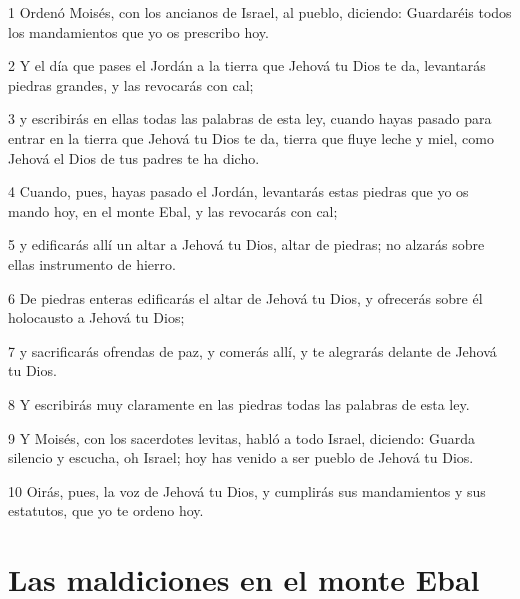 \par 1 Ordenó Moisés, con los ancianos de Israel, al pueblo, diciendo: Guardaréis todos los mandamientos que yo os prescribo hoy.
\par 2 Y el día que pases el Jordán a la tierra que Jehová tu Dios te da, levantarás piedras grandes, y las revocarás con cal; 
\par 3 y escribirás en ellas todas las palabras de esta ley, cuando hayas pasado para entrar en la tierra que Jehová tu Dios te da, tierra que fluye leche y miel, como Jehová el Dios de tus padres te ha dicho.
\par 4 Cuando, pues, hayas pasado el Jordán, levantarás estas piedras que yo os mando hoy, en el monte Ebal, y las revocarás con cal;
\par 5 y edificarás allí un altar a Jehová tu Dios, altar de piedras; no alzarás sobre ellas instrumento de hierro.
\par 6 De piedras enteras edificarás el altar de Jehová tu Dios, y ofrecerás sobre él holocausto a Jehová tu Dios;
\par 7 y sacrificarás ofrendas de paz, y comerás allí, y te alegrarás delante de Jehová tu Dios.
\par 8 Y escribirás muy claramente en las piedras todas las palabras de esta ley.
\par 9 Y Moisés, con los sacerdotes levitas, habló a todo Israel, diciendo: Guarda silencio y escucha, oh Israel; hoy has venido a ser pueblo de Jehová tu Dios.
\par 10 Oirás, pues, la voz de Jehová tu Dios, y cumplirás sus mandamientos y sus estatutos, que yo te ordeno hoy.

\section{Las maldiciones en el monte Ebal}

